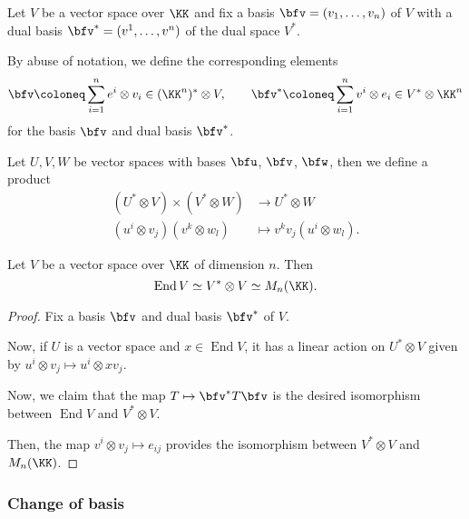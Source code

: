\documentclass{article}
\DeclareMathOperator{\End}{End}
\begin{document}
\begin{definition}
    Let $V$ be a vector space over $\KK$ and fix a basis $\bfv = (v_1,\ldots,v_n)$ of $V$ with a dual basis $\bfv^\ast = (v^1, \ldots, v^n)$ of the dual space $V^\ast$.

    By abuse of notation, we define the corresponding elements
    \[
        \bfv 
        \coloneq 
        \sum_{i=1}^n 
        e^i \otimes v_i 
        \in (\KK^n)^\ast \otimes V
        ,\qquad
        \bfv^\ast 
        \coloneq 
        \sum_{i=1}^n v^i \otimes e_i 
        \in V^\ast \otimes \KK^n
    \]
    for the basis $\bfv$ and dual basis $\bfv^\ast$.
\end{definition}

\begin{definition}
    Let $U, V, W$ be vector spaces with bases $\bfu$, $\bfv$, $\bfw$, then we define a product
    \begin{align*}
        (U^\ast \otimes V) \times (V^\ast \otimes W)
        &\to
        U^\ast \otimes W
        \\
        (u^i \otimes v_j)(v^k \otimes w_l)
        &\mapsto
        v^kv_j
        (u^i \otimes w_l).
    \end{align*}
\end{definition}

\begin{theorem}
    Let $V$ be a vector space over $\KK$ of dimension $n$.
    Then
    \[
        \End V
        \simeq
        V^\ast \otimes V
        \simeq
        M_n(\KK).
    \]
\end{theorem}

\begin{proof}
    Fix a basis $\bfv$ and dual basis $\bfv^\ast$ of $V$.

    Now, if $U$ is a vector space and $x \in \End V$, it has a linear action on $U^\ast \otimes V$ given by $u^i \otimes v_j \mapsto u^i \otimes xv_j$.

    Now, we claim that the map $T \mapsto \bfv^\ast T \bfv$ is the desired isomorphism between $\End V$ and $V^\ast \otimes V$.

    Then, the map $v^i \otimes v_j \mapsto e_{ij}$ provides the isomorphism between $V^\ast \otimes V$ and $M_n(\KK)$.
\end{proof}

\subsubsection{Change of basis}
\end{document}
